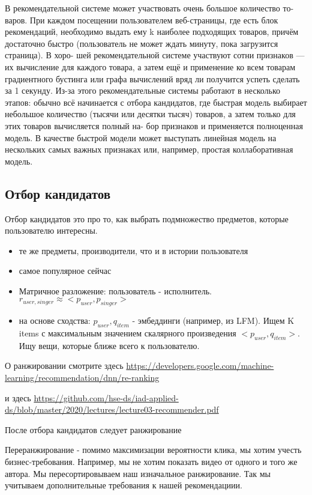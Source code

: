 В рекомендательной системе может участвовать очень большое количество то- варов. При каждом посещении пользователем веб-страницы, где есть блок рекомендаций, необходимо выдать ему k наиболее подходящих товаров, причём достаточно быстро (пользователь не может ждать минуту, пока загрузится страница). В хоро- шей рекомендательной системе участвуют сотни признаков — их вычисление для каждого товара, а затем ещё и применение ко всем товарам градиентного бустинга или графа вычислений вряд ли получится успеть сделать за 1 секунду. Из-за этого рекомендательные системы работают в несколько этапов: обычно всё начинается с отбора кандидатов, где быстрая модель выбирает небольшое количество (тысячи или десятки тысяч) товаров, а затем только для этих товаров вычисляется полный на- бор признаков и применяется полноценная модель. В качестве быстрой модели может выступать линейная модель на нескольких самых важных признаках или, например, простая коллаборативная модель.

\subsection{Отбор кандидатов}

Отбор кандидатов это про то, как выбрать подмножество предметов, которые пользователю интересны. 

\begin{itemize}
	\item те же предметы, производители, что и в истории пользователя 
	
	\item самое популярное сейчас
	
	\item Матричное разложение: пользователь - исполнитель. $r_{user, singer} \approx <p_{user}, p_{singer} >$
	
	\item на основе сходства: $p_{user}, q_{item}$  -  эмбеддинги (например, из LFM). Ищем K items с максимальным значением скалярного произведения $<p_{user}, q_{item}>$. Ищу вещи, которые ближе всего к пользователю. 
	
	
\end{itemize}


О ранжировании  смотрите здесь
\url{https://developers.google.com/machine-learning/recommendation/dnn/re-ranking}

и здесь \url{https://github.com/hse-ds/iad-applied-ds/blob/master/2020/lectures/lecture03-recommender.pdf}

После отбора кандидатов следует ранжирование

Переранжирование - помимо максимизации вероятности клика, мы хотим учесть бизнес-требования. Например, мы не хотим показать видео от одного и того же автора. Мы пересортировываем наш изначальное ранжирование. Так мы учитываем дополнительные требования к нашей рекомендациии. 
